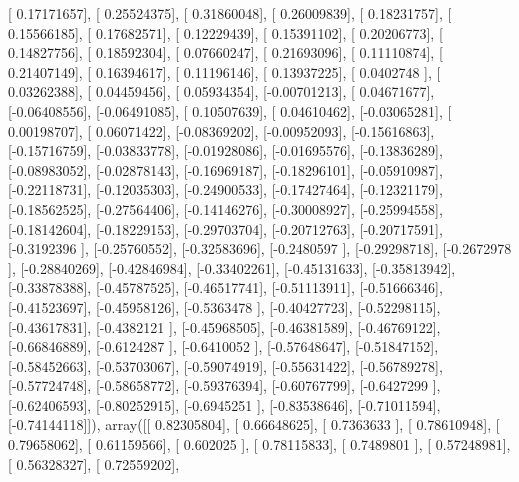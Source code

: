 \documentclass{article}
\begin{document}
       [ 0.17171657],
       [ 0.25524375],
       [ 0.31860048],
       [ 0.26009839],
       [ 0.18231757],
       [ 0.15566185],
       [ 0.17682571],
       [ 0.12229439],
       [ 0.15391102],
       [ 0.20206773],
       [ 0.14827756],
       [ 0.18592304],
       [ 0.07660247],
       [ 0.21693096],
       [ 0.11110874],
       [ 0.21407149],
       [ 0.16394617],
       [ 0.11196146],
       [ 0.13937225],
       [ 0.0402748 ],
       [ 0.03262388],
       [ 0.04459456],
       [ 0.05934354],
       [-0.00701213],
       [ 0.04671677],
       [-0.06408556],
       [-0.06491085],
       [ 0.10507639],
       [ 0.04610462],
       [-0.03065281],
       [ 0.00198707],
       [ 0.06071422],
       [-0.08369202],
       [-0.00952093],
       [-0.15616863],
       [-0.15716759],
       [-0.03833778],
       [-0.01928086],
       [-0.01695576],
       [-0.13836289],
       [-0.08983052],
       [-0.02878143],
       [-0.16969187],
       [-0.18296101],
       [-0.05910987],
       [-0.22118731],
       [-0.12035303],
       [-0.24900533],
       [-0.17427464],
       [-0.12321179],
       [-0.18562525],
       [-0.27564406],
       [-0.14146276],
       [-0.30008927],
       [-0.25994558],
       [-0.18142604],
       [-0.18229153],
       [-0.29703704],
       [-0.20712763],
       [-0.20717591],
       [-0.3192396 ],
       [-0.25760552],
       [-0.32583696],
       [-0.2480597 ],
       [-0.29298718],
       [-0.2672978 ],
       [-0.28840269],
       [-0.42846984],
       [-0.33402261],
       [-0.45131633],
       [-0.35813942],
       [-0.33878388],
       [-0.45787525],
       [-0.46517741],
       [-0.51113911],
       [-0.51666346],
       [-0.41523697],
       [-0.45958126],
       [-0.5363478 ],
       [-0.40427723],
       [-0.52298115],
       [-0.43617831],
       [-0.4382121 ],
       [-0.45968505],
       [-0.46381589],
       [-0.46769122],
       [-0.66846889],
       [-0.6124287 ],
       [-0.6410052 ],
       [-0.57648647],
       [-0.51847152],
       [-0.58452663],
       [-0.53703067],
       [-0.59074919],
       [-0.55631422],
       [-0.56789278],
       [-0.57724748],
       [-0.58658772],
       [-0.59376394],
       [-0.60767799],
       [-0.6427299 ],
       [-0.62406593],
       [-0.80252915],
       [-0.6945251 ],
       [-0.83538646],
       [-0.71011594],
       [-0.74144118]]), array([[ 0.82305804],
       [ 0.66648625],
       [ 0.7363633 ],
       [ 0.78610948],
       [ 0.79658062],
       [ 0.61159566],
       [ 0.602025  ],
       [ 0.78115833],
       [ 0.7489801 ],
       [ 0.57248981],
       [ 0.56328327],
       [ 0.72559202],
\end{document}
